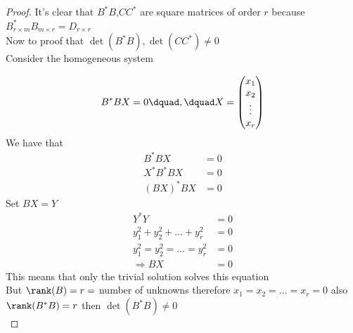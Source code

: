 \begin{proof}[\textcolor{theme}{Proof}]
        It's clear that $B^{*}B$,$CC^{*}$ are square matrices of order $r$ because $B_{r \times m}^{*}B_{m \times r} = D_{r \times r}$ 
        \\
        Now to proof that $\det(B^{*}B) ,\det(CC^{*}) \neq 0 $
        \\
        Consider the homogeneous system

        \[
        B^{*}B X = 0  \dquad,\dquad X = \begin{pmatrix}
        x_1\\
        x_2\\
        \vdots\\
        x_r\\
        \end{pmatrix}        
        \]
We have that 
        \begin{align*}
                B^{*}B X &= 0 \tag{multiply $X^*$ from the left}
                \\
                X^{*}B^{*}B X &= 0 
                \\
                (BX)^{*}BX &= 0
        \end{align*}
Set $BX = Y$
        \begin{align*}
                Y^{*}Y &= 0
                \\
                y_1^{2} + y_2^{2} + \dots + y_r^{2} &= 0
                \\
                y_1^{2} = y_2^{2} = \dots = y_r^{2} &= 0
                \\
                \Longrightarrow BX &= 0 
        \end{align*}
This means that only the trivial solution solves this equation
\\
But $\rank(B)=r=$ number of unknowns therefore $x_1 = x_2 = \dots = x_r = 0$
also $\rank(B^{*}B)=r$ then $\det(B^{*}B) \neq 0$
\\
\end{proof}

